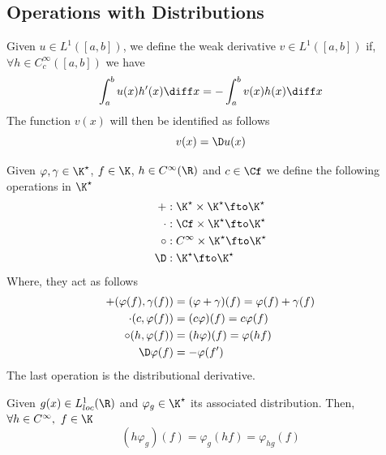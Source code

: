 \documentclass[../mmf.tex]{subfiles}
\begin{document}
\subsection{Operations with Distributions}
\begin{dfn}
	Given $u\in L^1([a,b])$, we define the weak derivative $v\in L^1([a,b])$ if, $\forall h\in C_c^\infty([a,b])$ we have
	\begin{equation*}
		\int_{a}^{b}u(x)h'(x)\diff x=-\int_{a}^{b}v(x)h(x)\diff x
	\end{equation*}
	The function $v(x)$ will then be identified as follows
	\begin{equation*}
		v(x)=\D u(x)
	\end{equation*}
\end{dfn}
\begin{thm}
	Given $\varphi,\gamma\in\K^\star$, $f\in\K$, $h\in C^\infty(\R)$ and $c\in\Cf$ we define the following operations in $\K^\star$
	\begin{equation}
		\begin{aligned}
			+&:\K^\star\times\K^\star\fto\K^\star\\
			\cdot&:\Cf\times\K^\star\fto\K^\star\\
			\circ&:C^\infty\times\K^\star\fto\K^\star\\
			\D&:\K^\star\fto\K^\star
		\end{aligned}
		\label{eq:operationsdef}
	\end{equation}
	Where, they act as follows
	\begin{equation*}
		\begin{aligned}
			+(\varphi(f),\gamma(f))&=(\varphi+\gamma)(f)=\varphi(f)+\gamma(f)\\
			\cdot(c,\varphi(f))&=(c\varphi)(f)=c\varphi(f)\\
			\circ(h,\varphi(f))&=(h\varphi)(f)=\varphi(hf)\\
			\D\varphi(f)&=-\varphi(f')
		\end{aligned}
	\end{equation*}
	The last operation is the distributional derivative.\\
\end{thm}
\begin{thm}
	Given $g(x)\in L^1_{loc}(\R)$ and $\varphi_g\in\K^\star$ its associated distribution. Then, $\forall h\in C^\infty,\ f\in\K$
	\begin{equation}
		(h\varphi_g)(f)=\varphi_g(hf)=\varphi_{hg}(f)
		\label{eq:cinftyprod}
	\end{equation}
\end{thm}
\end{document}
